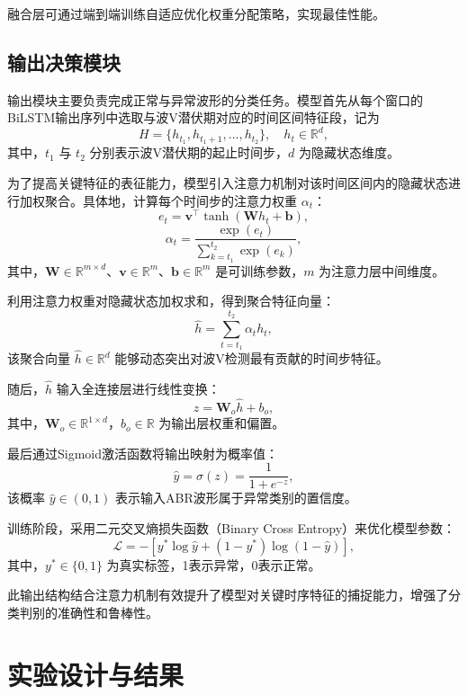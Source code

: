 融合层可通过端到端训练自适应优化权重分配策略，实现最佳性能。


\subsection*{输出决策模块}

输出模块主要负责完成正常与异常波形的分类任务。模型首先从每个窗口的BiLSTM输出序列中选取与波V潜伏期对应的时间区间特征段，记为
\[
H = \{h_{t_1}, h_{t_1+1}, \ldots, h_{t_2}\}, \quad h_{t} \in \mathbb{R}^d,
\]
其中，\(t_1\) 与 \(t_2\) 分别表示波V潜伏期的起止时间步，\(d\) 为隐藏状态维度。

为了提高关键特征的表征能力，模型引入注意力机制对该时间区间内的隐藏状态进行加权聚合。具体地，计算每个时间步的注意力权重 \(\alpha_t\)：
\[
e_t = \mathbf{v}^\top \tanh(\mathbf{W} h_t + \mathbf{b}),
\]
\[
\alpha_t = \frac{\exp(e_t)}{\sum_{k=t_1}^{t_2} \exp(e_k)},
\]
其中，\(\mathbf{W} \in \mathbb{R}^{m \times d}\)、\(\mathbf{v} \in \mathbb{R}^m\)、\(\mathbf{b} \in \mathbb{R}^m\) 是可训练参数，\(m\) 为注意力层中间维度。

利用注意力权重对隐藏状态加权求和，得到聚合特征向量：
\[
\hat{h} = \sum_{t=t_1}^{t_2} \alpha_t h_t,
\]
该聚合向量 \(\hat{h} \in \mathbb{R}^d\) 能够动态突出对波V检测最有贡献的时间步特征。

随后，\(\hat{h}\) 输入全连接层进行线性变换：
\[
z = \mathbf{W}_o \hat{h} + b_o,
\]
其中，\(\mathbf{W}_o \in \mathbb{R}^{1 \times d}\)，\(b_o \in \mathbb{R}\) 为输出层权重和偏置。

最后通过Sigmoid激活函数将输出映射为概率值：
\[
\hat{y} = \sigma(z) = \frac{1}{1 + e^{-z}},
\]
该概率 \(\hat{y} \in (0,1)\) 表示输入ABR波形属于异常类别的置信度。

训练阶段，采用二元交叉熵损失函数（Binary Cross Entropy）来优化模型参数：
\[
\mathcal{L} = - \left[ y^* \log \hat{y} + (1 - y^*) \log (1 - \hat{y}) \right],
\]
其中，\(y^* \in \{0,1\}\) 为真实标签，1表示异常，0表示正常。

此输出结构结合注意力机制有效提升了模型对关键时序特征的捕捉能力，增强了分类判别的准确性和鲁棒性。

\section{实验设计与结果}

